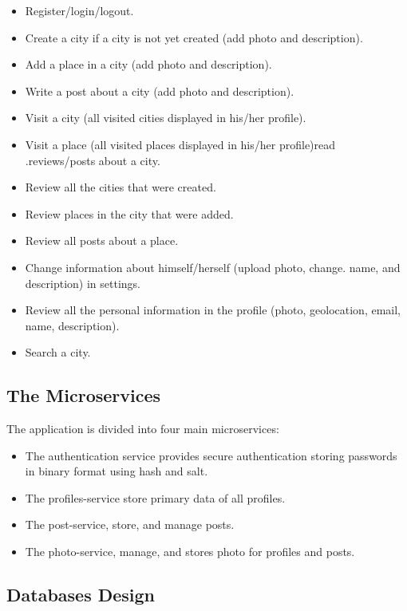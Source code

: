 \begin{itemize}
	 

\item Register/login/logout.
\item Create a city if a city is not yet created (add photo and description).
\item Add a place in a city (add photo and description).
\item Write a post about a city (add photo and description).
\item Visit a city (all visited cities displayed in his/her profile).
\item Visit a place (all visited places displayed in his/her profile)read .reviews/posts about a city.
\item Review all the cities that were created.
\item Review places in the city that were added.
\item Review all posts about a place.
\item Change information about himself/herself (upload photo, change. name, and description) in settings.
\item Review all the personal information in the profile (photo, geolocation, email, name, description).
\item Search a city.

\end{itemize}

\subsection{The Microservices}

The application is divided into four main microservices:
\begin{itemize}
	\item The authentication service provides secure authentication storing passwords in binary format using hash and salt.
 \item	The profiles-service store primary data of all profiles.
\item	The post-service, store, and manage posts.
\item	The photo-service, manage, and stores photo for profiles and posts. 
\end{itemize}




\subsection{Databases Design}

